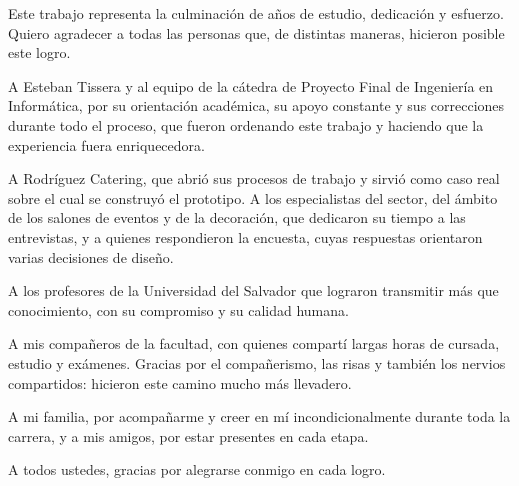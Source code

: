 
Este trabajo representa la culminación de años de estudio, dedicación y
esfuerzo. Quiero agradecer a todas las personas que, de distintas maneras,
hicieron posible este logro.

A Esteban Tissera y al equipo de la cátedra de Proyecto Final de
Ingeniería en Informática, por su orientación académica, su apoyo
constante y sus correcciones durante todo el proceso, que fueron
ordenando este trabajo y haciendo que la experiencia fuera enriquecedora.

A Rodríguez Catering, que abrió sus procesos de trabajo y sirvió como caso
real sobre el cual se construyó el prototipo. A los especialistas del
sector, del ámbito de los salones de eventos y de la decoración, que
dedicaron su tiempo a las entrevistas, y a quienes respondieron la
encuesta, cuyas respuestas orientaron varias decisiones de diseño.

A los profesores de la Universidad del Salvador que lograron transmitir
más que conocimiento, con su compromiso y su calidad humana.

A mis compañeros de la facultad, con quienes compartí largas horas de
cursada, estudio y exámenes. Gracias por el compañerismo, las risas y
también los nervios compartidos: hicieron este camino mucho más llevadero.

A mi familia, por acompañarme y creer en mí incondicionalmente durante
toda la carrera, y a mis amigos, por estar presentes en cada etapa.

A todos ustedes, gracias por alegrarse conmigo en cada logro.
